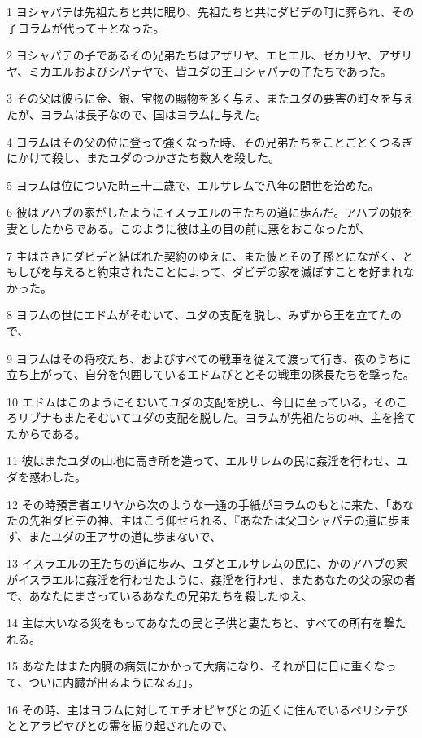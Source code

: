\par 1 ヨシャパテは先祖たちと共に眠り、先祖たちと共にダビデの町に葬られ、その子ヨラムが代って王となった。
\par 2 ヨシャパテの子であるその兄弟たちはアザリヤ、エヒエル、ゼカリヤ、アザリヤ、ミカエルおよびシパテヤで、皆ユダの王ヨシャパテの子たちであった。
\par 3 その父は彼らに金、銀、宝物の賜物を多く与え、またユダの要害の町々を与えたが、ヨラムは長子なので、国はヨラムに与えた。
\par 4 ヨラムはその父の位に登って強くなった時、その兄弟たちをことごとくつるぎにかけて殺し、またユダのつかさたち数人を殺した。
\par 5 ヨラムは位についた時三十二歳で、エルサレムで八年の間世を治めた。
\par 6 彼はアハブの家がしたようにイスラエルの王たちの道に歩んだ。アハブの娘を妻としたからである。このように彼は主の目の前に悪をおこなったが、
\par 7 主はさきにダビデと結ばれた契約のゆえに、また彼とその子孫とにながく、ともしびを与えると約束されたことによって、ダビデの家を滅ぼすことを好まれなかった。
\par 8 ヨラムの世にエドムがそむいて、ユダの支配を脱し、みずから王を立てたので、
\par 9 ヨラムはその将校たち、およびすべての戦車を従えて渡って行き、夜のうちに立ち上がって、自分を包囲しているエドムびととその戦車の隊長たちを撃った。
\par 10 エドムはこのようにそむいてユダの支配を脱し、今日に至っている。そのころリブナもまたそむいてユダの支配を脱した。ヨラムが先祖たちの神、主を捨てたからである。
\par 11 彼はまたユダの山地に高き所を造って、エルサレムの民に姦淫を行わせ、ユダを惑わした。
\par 12 その時預言者エリヤから次のような一通の手紙がヨラムのもとに来た、「あなたの先祖ダビデの神、主はこう仰せられる、『あなたは父ヨシャパテの道に歩まず、またユダの王アサの道に歩まないで、
\par 13 イスラエルの王たちの道に歩み、ユダとエルサレムの民に、かのアハブの家がイスラエルに姦淫を行わせたように、姦淫を行わせ、またあなたの父の家の者で、あなたにまさっているあなたの兄弟たちを殺したゆえ、
\par 14 主は大いなる災をもってあなたの民と子供と妻たちと、すべての所有を撃たれる。
\par 15 あなたはまた内臓の病気にかかって大病になり、それが日に日に重くなって、ついに内臓が出るようになる』」。
\par 16 その時、主はヨラムに対してエチオピヤびとの近くに住んでいるペリシテびととアラビヤびとの霊を振り起されたので、
